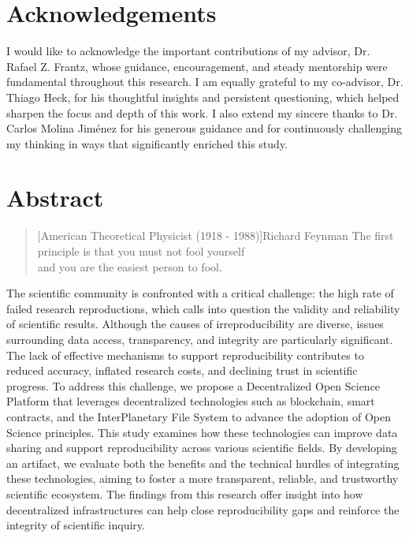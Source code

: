 \documentclass[final]{rc-book-2.14}
\begin{document}
\chapter{Acknowledgements}
\label{chp:acknowledge}

\drop
I would like to acknowledge the important contributions of my advisor, Dr. Rafael Z. Frantz, whose guidance, encouragement, and steady mentorship were fundamental throughout this research. I am equally grateful to my co-advisor, Dr. Thiago Heck, for his thoughtful insights and persistent questioning, which helped sharpen the focus and depth of this work. I also extend my sincere thanks to Dr. Carlos Molina Jiménez for his generous guidance and for continuously challenging my thinking in ways that significantly enriched this study.

\chapter{Abstract}
\label{chp:general-abstract:english}


\begin{quotation}[American Theoretical Physicist (1918 - 1988)]{Richard Feynman}
    The first principle is that you must not fool yourself \\ and you are the easiest person to fool.
\end{quotation}

\drop  The scientific community is confronted with a critical challenge: the high rate of failed research reproductions, which calls into question the validity and reliability of scientific results. Although the causes of irreproducibility are diverse, issues surrounding data access, transparency, and integrity are particularly significant. The lack of effective mechanisms to support reproducibility contributes to reduced accuracy, inflated research costs, and declining trust in scientific progress. To address this challenge, we propose a Decentralized Open Science Platform that leverages decentralized technologies such as blockchain, smart contracts, and the InterPlanetary File System to advance the adoption of Open Science principles. This study examines how these technologies can improve data sharing and support reproducibility across various scientific fields. By developing an artifact, we evaluate both the benefits and the technical hurdles of integrating these technologies, aiming to foster a more transparent, reliable, and trustworthy scientific ecosystem. The findings from this research offer insight into how decentralized infrastructures can help close reproducibility gaps and reinforce the integrity of scientific inquiry.
\end{document}
